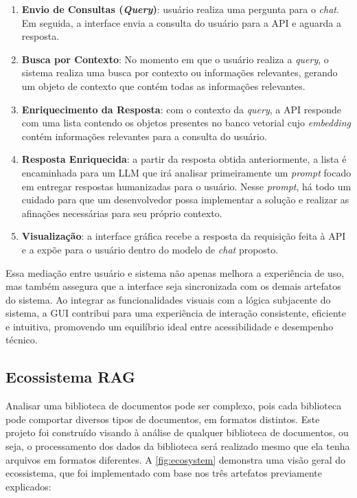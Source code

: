 \documentclass[a4paper, 12pt]{article}
\begin{document}
    \begin{enumerate}
        \item \textbf{Envio de Consultas (\textit{Query})}: usuário realiza uma pergunta para o \textit{chat}. Em seguida, a interface envia a consulta do usuário para a API e aguarda a resposta.
        \item \textbf{Busca por Contexto}: No momento em que o usuário realiza a \textit{query}, o sistema realiza uma busca por contexto ou informações relevantes, gerando um objeto de contexto que contém todas as informações relevantes.
        \item \textbf{Enriquecimento da Resposta}: com o contexto da \textit{query}, a API responde com uma lista contendo os objetos presentes no banco vetorial cujo \textit{embedding} contém informações relevantes para a consulta do usuário.
        \item \textbf{Resposta Enriquecida}: a partir da resposta obtida anteriormente, a lista é encaminhada para um LLM que irá analisar primeiramente um \textit{prompt} focado em entregar respostas humanizadas para o usuário. Nesse \textit{prompt}, há todo um cuidado para que um desenvolvedor possa implementar a solução e realizar as afinações necessárias para seu próprio contexto.
        \item \textbf{Visualização}: a interface gráfica recebe a resposta da requisição feita à API e a expõe para o usuário dentro do modelo de \textit{chat} proposto.
    \end{enumerate}

    Essa mediação entre usuário e sistema não apenas melhora a experiência de uso, mas também assegura que a interface seja sincronizada com os demais artefatos do sistema. Ao integrar as funcionalidades visuais com a lógica subjacente do sistema, a GUI contribui para uma experiência de interação consistente, eficiente e intuitiva, promovendo um equilíbrio ideal entre acessibilidade e desempenho técnico.
    
    \subsection{Ecossistema RAG} \label{sec:ecosystem}
    
    Analisar uma biblioteca de documentos pode ser complexo, pois cada biblioteca pode comportar diversos tipos de documentos, em formatos distintos. Este projeto foi construído visando à análise de qualquer biblioteca de documentos, ou seja, o processamento dos dados da biblioteca será realizado mesmo que ela tenha arquivos em formatos diferentes. A \autoref{fig:ecosystem} demonstra uma visão geral do ecossistema, que foi implementado com base nos três artefatos previamente explicados:
\end{document}
